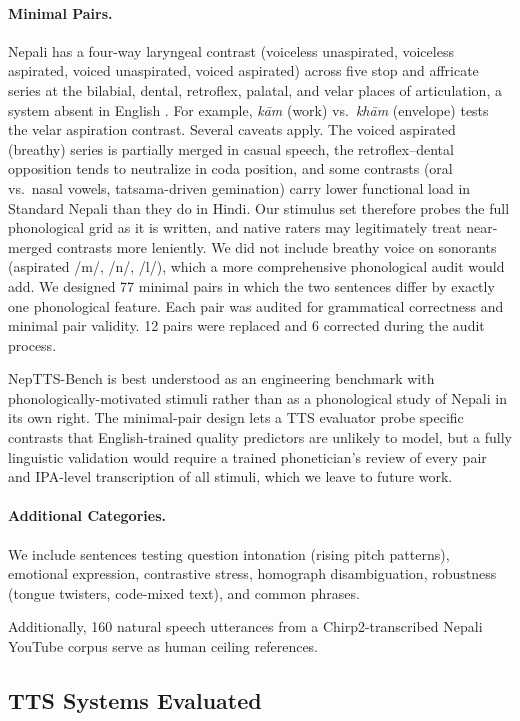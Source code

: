 \documentclass[11pt]{article}
\begin{document}
\paragraph{Minimal Pairs.} Nepali has a four-way laryngeal contrast (voiceless unaspirated, voiceless aspirated, voiced unaspirated, voiced aspirated) across five stop and affricate series at the bilabial, dental, retroflex, palatal, and velar places of articulation, a system absent in English \citep{khatiwada2009, pokharel1989}. For example, \textit{k\=am} (work) vs.\ \textit{kh\=am} (envelope) tests the velar aspiration contrast. Several caveats apply. The voiced aspirated (breathy) series is partially merged in casual speech, the retroflex--dental opposition tends to neutralize in coda position, and some contrasts (oral vs.\ nasal vowels, tatsama-driven gemination) carry lower functional load in Standard Nepali than they do in Hindi. Our stimulus set therefore probes the full phonological grid as it is written, and native raters may legitimately treat near-merged contrasts more leniently. We did not include breathy voice on sonorants (aspirated /m/, /n/, /l/), which a more comprehensive phonological audit would add. We designed 77 minimal pairs in which the two sentences differ by exactly one phonological feature. Each pair was audited for grammatical correctness and minimal pair validity. 12 pairs were replaced and 6 corrected during the audit process.

NepTTS-Bench is best understood as an engineering benchmark with phonologically-motivated stimuli rather than as a phonological study of Nepali in its own right. The minimal-pair design lets a TTS evaluator probe specific contrasts that English-trained quality predictors are unlikely to model, but a fully linguistic validation would require a trained phonetician's review of every pair and IPA-level transcription of all stimuli, which we leave to future work.

\paragraph{Additional Categories.} We include sentences testing question intonation (rising pitch patterns), emotional expression, contrastive stress, homograph disambiguation, robustness (tongue twisters, code-mixed text), and common phrases.

Additionally, 160 natural speech utterances from a Chirp2-transcribed Nepali YouTube corpus serve as human ceiling references.

\subsection{TTS Systems Evaluated}
\end{document}
